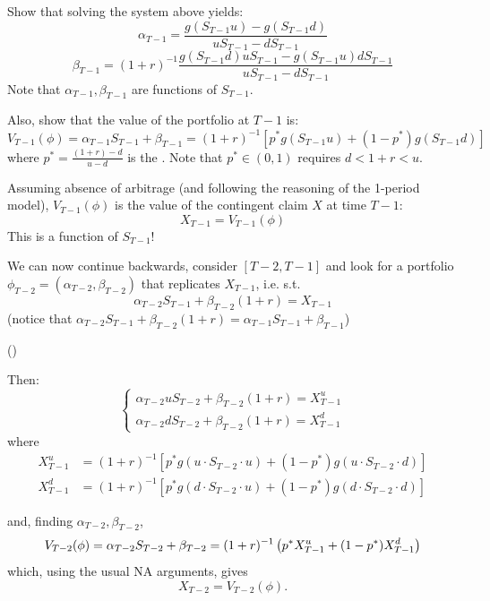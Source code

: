 \begin{homework}
    Show that solving the system above yields:
    \[ \alpha_{T-1} = \frac{g(S_{T-1} u) - g(S_{T-1} d)}{u S_{T-1} - d S_{T-1}} \]
    \[ \beta_{T-1} = (1+r)^{-1} \frac{g(S_{T-1} d) u S_{T-1} - g(S_{T-1} u) d S_{T-1}}{u S_{T-1} - d S_{T-1}} \]
    Note that $\alpha_{T-1}, \beta_{T-1}$ are functions of $S_{T-1}$.
    
    Also, show that the value of the portfolio at $T-1$ is:
    \[ V_{T-1}(\phi) = \alpha_{T-1} S_{T-1} + \beta_{T-1} = (1+r)^{-1} \left[ p^* g(S_{T-1} u) + (1 - p^*) g(S_{T-1} d) \right] \]
    where $p^* = \frac{(1+r) - d}{u - d}$ is the . Note that $p^* \in (0, 1)$ requires $d < 1+r < u$.
\end{homework}

\begin{remark}
    Assuming absence of arbitrage (and following the reasoning of the 1-period model), $V_{T-1}(\phi)$ is the value of the contingent claim $X$ at time $T-1$:
    \[ X_{T-1} = V_{T-1}(\phi) \]
    This is a function of $S_{T-1}$!
\end{remark}

\begin{remark}
    We can now continue backwards, consider $[T-2, T-1]$ and look for a portfolio $\phi_{T-2} = (\alpha_{T-2}, \beta_{T-2})$ that replicates $X_{T-1}$, i.e. s.t.
    \[ \alpha_{T-2} S_{T-1} + \beta_{T-2} (1+r) = X_{T-1} \]
    (notice that $\alpha_{T-2} S_{T-1} + \beta_{T-2} (1+r) = \alpha_{T-1} S_{T-1} + \beta_{T-1}$)
    \begin{center}
        ()
    \end{center}
    
    Then:
    \[ \begin{cases} \alpha_{T-2} u S_{T-2} + \beta_{T-2} (1+r) = X_{T-1}^u \\ \alpha_{T-2} d S_{T-2} + \beta_{T-2} (1+r) = X_{T-1}^d \end{cases} \]
    where 
    \begin{align*}
        X_{T-1}^u &= (1+r)^{-1} \left[ p^* g(u \cdot S_{T-2} \cdot u) + (1-p^*) g(u \cdot S_{T-2} \cdot d) \right] \\
        X_{T-1}^d &= (1+r)^{-1} \left[ p^* g(d \cdot S_{T-2} \cdot u) + (1-p^*) g(d \cdot S_{T-2} \cdot d) \right]
    \end{align*}
    
    and, finding $\alpha_{T-2}, \beta_{T-2}$,
    \[ V_{T-2}(\phi) = \alpha_{T-2} S_{T-2} + \beta_{T-2} = (1+r)^{-1} \left( p^* X_{T-1}^u + (1-p^*) X_{T-1}^d \right) \]
    which, using the usual NA arguments, gives
    \[ X_{T-2} = V_{T-2}(\phi). \]
\end{remark}

